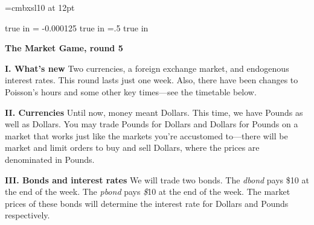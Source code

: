 \twelvepoint
\def\interline{12pt}
\font\bfsl=cmbxsl10 at 12pt

\newcount\notenumber
\def\clearnotenumber{\notenumber=0\relax}
\def\note#1{%
  \advance\notenumber by 1\baselineskip=12pt
  \footnote{$^{\the\notenumber}$}{{\tenpoint #1\vskip -12pt}}
  \baselineskip=\interline}
\clearnotenumber

\def\section#1{\vskip 4pt\noindent
  {\baselineskip 9pt\relax\bf#1}\vskip 0pt\noindent}
\def\subsection#1{\vskip 4pt\noindent
  {\baselineskip 9pt\relax\bfsl#1}\vskip 0pt\noindent}

\parskip=4pt
\baselineskip=\interline
 true in\relax
\hoffset= -0.000125 true in
\voffset=.5 true in


\centerline{{\bf The Market Game, round 5}}

\section{I. What's new}%
Two currencies, a foreign exchange market, and endogenous interest rates.
This round lasts just one week.  Also, there have been changes to Poisson's
hours and some other key times---see the timetable below.

\section{II. Currencies}%
Until now, money meant Dollars.  This time, we have Pounds as well as
Dollars.  You may trade Pounds for Dollars and Dollars for Pounds on a
market that works just like the markets you're accustomed to---there
will be market and limit orders to buy and sell Dollars, where the
prices are denominated in Pounds.

\section{III. Bonds and interest rates}%
We will trade two bonds.  The {\it dbond} pays \$10 at the end of the
week.  The {\it pbond} pays {\it\$}10 at the end of the week.  The
market prices of these bonds will determine the interest rate for
Dollars and Pounds respectively.

